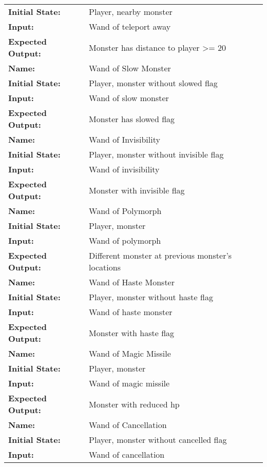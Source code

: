 \documentclass[12pt, titlepage]{article}
\begin{document}
\begin{center}
\begin{longtable}{ l | p{10cm} }
				\textbf{Initial State:} & Player, nearby monster\\
				\textbf{Input:} & Wand of teleport away\\
				\textbf{Expected Output:} & Monster has distance to player >= 20\\[1em]
				\hline
				\rule{0pt}{2em}\textbf{Name:} & Wand of Slow Monster\\
				\textbf{Initial State:} & Player, monster without slowed flag\\
				\textbf{Input:} & Wand of slow monster\\
				\textbf{Expected Output:} & Monster has slowed flag\\[1em]
				\hline
				\rule{0pt}{2em}\textbf{Name:} & Wand of Invisibility\\
				\textbf{Initial State:} & Player, monster without invisible flag\\
				\textbf{Input:} & Wand of invisibility\\
				\textbf{Expected Output:} & Monster with invisible flag\\[1em]
				\hline
				\rule{0pt}{2em}\textbf{Name:} & Wand of Polymorph\\
				\textbf{Initial State:} & Player, monster\\
				\textbf{Input:} & Wand of polymorph\\
				\textbf{Expected Output:} & Different monster at previous monster's locations\\[1em]
				\hline
				\rule{0pt}{2em}\textbf{Name:} & Wand of Haste Monster\\
				\textbf{Initial State:} & Player, monster without haste flag\\
				\textbf{Input:} & Wand of haste monster\\
				\textbf{Expected Output:} & Monster with haste flag\\[1em]
				\hline
				\rule{0pt}{2em}\textbf{Name:} & Wand of Magic Missile\\
				\textbf{Initial State:} & Player, monster\\
				\textbf{Input:} & Wand of magic missile\\
				\textbf{Expected Output:} & Monster with reduced hp\\[1em]
				\hline
				\rule{0pt}{2em}\textbf{Name:} & Wand of Cancellation\\
				\textbf{Initial State:} & Player, monster without cancelled flag\\
				\textbf{Input:} & Wand of cancellation\\

\end{longtable}
\end{center}
\end{document}
